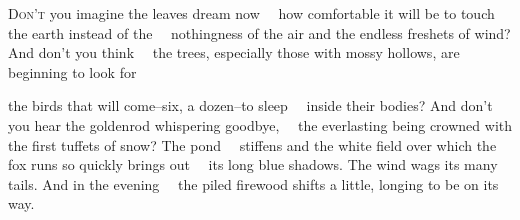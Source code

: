 
\begin{poem}
\begin{stanza}
\textsc{Don't} you imagine the leaves dream now\verseline
~~how comfortable it will be to touch\verseline
the earth instead of the\verseline
~~nothingness of the air and the endless\verseline
freshets of wind? And don't you think\verseline
~~the trees, especially those with\verseline
mossy hollows, are beginning to look for
\end{stanza}

\begin{stanza}
the birds that will come--six, a dozen--to sleep\verseline
~~inside their bodies? And don't you hear\verseline
the goldenrod whispering goodbye,\verseline
~~the everlasting being crowned with the first\verseline
tuffets of snow? The pond\verseline
~~stiffens and the white field over which\verseline
the fox runs so quickly brings out\verseline
~~its long blue shadows. The wind wags\verseline
its many tails. And in the evening\verseline
~~the piled firewood shifts a little,\verseline
longing to be on its way.
\end{stanza}
\end{poem}